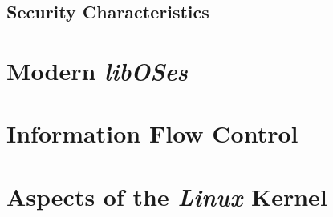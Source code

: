 \subsection{Security Characteristics}

\section{Modern \textit{libOSes}}

\section{Information Flow Control}

\section{Aspects of the \textit{Linux} Kernel}